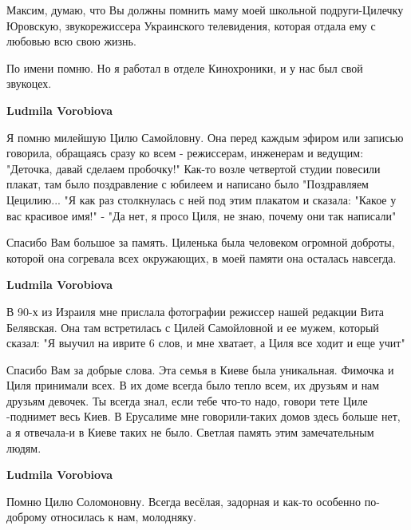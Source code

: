 \begin{itemize}
Максим, думаю, что Вы должны помнить маму моей школьной подруги-Цилечку
Юровскую, звукорежиссера Украинского телевидения, которая отдала ему с любовью
всю свою жизнь.

\begin{itemize} %
По имени помню. Но я работал в отделе Кинохроники, и у нас был свой звукоцех.

\textbf{Ludmila Vorobiova} 

Я помню милейшую Цилю Самойловну. Она перед каждым эфиром или записью говорила,
обращаясь сразу ко всем - режиссерам, инженерам и ведущим: "Деточка, давай
сделаем пробочку!" Как-то возле четвертой студии повесили плакат, там было
поздравление с юбилеем и написано было "Поздравляем Цецилию... "Я как раз
столкнулась с ней под этим плакатом и сказала: "Какое у вас красивое имя!" - "Да
нет, я просо Циля, не знаю, почему они так написали"


Спасибо Вам большое за память. Циленька была человеком огромной доброты, которой
она согревала всех окружающих, в моей памяти она осталась навсегда.

\begin{itemize} %
\textbf{Ludmila Vorobiova} 

В 90-х из Израиля мне прислала фотографии режиссер нашей редакции Вита
Белявская. Она там встретилась с Цилей Самойловной и ее мужем, который сказал:
"Я выучил на иврите 6 слов, и мне хватает, а Циля все ходит и еще учит"


Спасибо Вам за добрые слова. Эта семья в Киеве была уникальная. Фимочка и Циля
принимали всех. В их доме всегда было тепло всем, их друзьям и нам друзьям
девочек. Ты всегда знал, если тебе что-то надо, говори тете Циле -поднимет весь
Киев. В Ерусалиме мне говорили-таких домов здесь больше нет, а я отвечала-и в
Киеве таких не было. Светлая память этим замечательным людям.

\end{itemize} %

\textbf{Ludmila Vorobiova} 

Помню Цилю Соломоновну. Всегда весёлая, задорная и как-то особенно по-доброму
относилась к нам, молодняку.

\end{itemize} %



\end{itemize}
